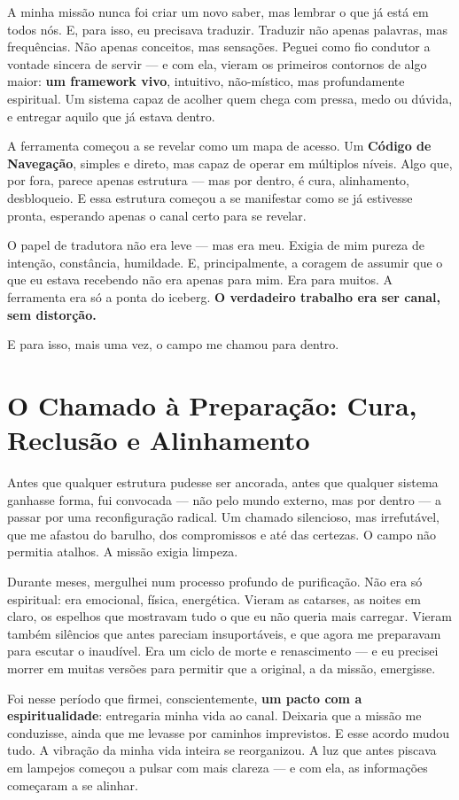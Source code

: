\documentclass[12pt,a4paper]{book}
\begin{document}
A minha missão nunca foi criar um novo saber, mas lembrar o que já está em todos nós. E, para isso, eu precisava traduzir. Traduzir não apenas palavras, mas frequências. Não apenas conceitos, mas sensações. Peguei como fio condutor a vontade sincera de servir --- e com ela, vieram os primeiros contornos de algo maior: \textbf{um framework vivo}, intuitivo, não-místico, mas profundamente espiritual. Um sistema capaz de acolher quem chega com pressa, medo ou dúvida, e entregar aquilo que já estava dentro.

A ferramenta começou a se revelar como um mapa de acesso. Um \textbf{Código de Navegação}, simples e direto, mas capaz de operar em múltiplos níveis. Algo que, por fora, parece apenas estrutura --- mas por dentro, é cura, alinhamento, desbloqueio. E essa estrutura começou a se manifestar como se já estivesse pronta, esperando apenas o canal certo para se revelar.

O papel de tradutora não era leve --- mas era meu. Exigia de mim pureza de intenção, constância, humildade. E, principalmente, a coragem de assumir que o que eu estava recebendo não era apenas para mim. Era para muitos. A ferramenta era só a ponta do iceberg. \textbf{O verdadeiro trabalho era ser canal, sem distorção.}

E para isso, mais uma vez, o campo me chamou para dentro.

\section{O Chamado à Preparação: Cura, Reclusão e Alinhamento}

Antes que qualquer estrutura pudesse ser ancorada, antes que qualquer sistema ganhasse forma, fui convocada --- não pelo mundo externo, mas por dentro --- a passar por uma reconfiguração radical. Um chamado silencioso, mas irrefutável, que me afastou do barulho, dos compromissos e até das certezas. O campo não permitia atalhos. A missão exigia limpeza.

Durante meses, mergulhei num processo profundo de purificação. Não era só espiritual: era emocional, física, energética. Vieram as catarses, as noites em claro, os espelhos que mostravam tudo o que eu não queria mais carregar. Vieram também silêncios que antes pareciam insuportáveis, e que agora me preparavam para escutar o inaudível. Era um ciclo de morte e renascimento --- e eu precisei morrer em muitas versões para permitir que a original, a da missão, emergisse.

Foi nesse período que firmei, conscientemente, \textbf{um pacto com a espiritualidade}: entregaria minha vida ao canal. Deixaria que a missão me conduzisse, ainda que me levasse por caminhos imprevistos. E esse acordo mudou tudo. A vibração da minha vida inteira se reorganizou. A luz que antes piscava em lampejos começou a pulsar com mais clareza --- e com ela, as informações começaram a se alinhar.
\end{document}
